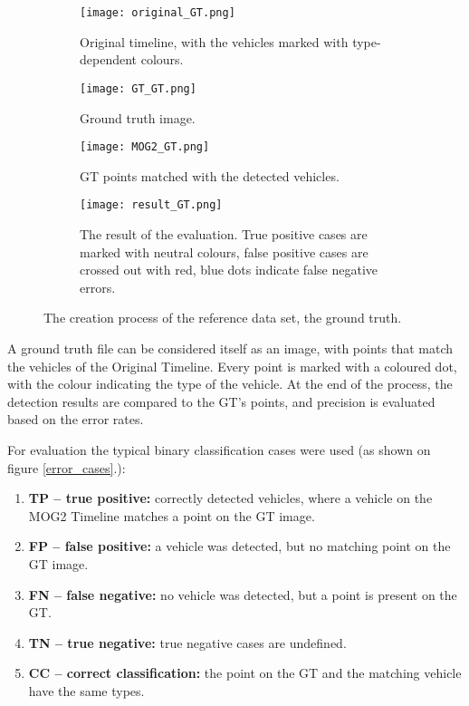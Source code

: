 \begin{figure}[!h]
	\centering
	\begin{subfigure}[!h]{0.9\textwidth}
		\texttt{[image: original\_GT.png]}
		\caption{Original timeline, with the vehicles marked with type-dependent colours.\label{fig:GT_original}}
	\end{subfigure}
	\hfill
	\begin{subfigure}[!h]{0.9\textwidth}
		\texttt{[image: GT\_GT.png]}
		\caption{Ground truth image.\label{fig:GT_GT}}
	\end{subfigure}
	\hfill
	\begin{subfigure}[!h]{0.9\textwidth}
		\texttt{[image: MOG2\_GT.png]}
		\caption{GT points matched with the detected vehicles. \label{fig:GT_MOG}}
	\end{subfigure}
	\hfill
	\begin{subfigure}[!h]{0.9\textwidth}
		\texttt{[image: result\_GT.png]}
		\caption{The result of the evaluation. True positive cases are marked with neutral colours, false positive cases are crossed out with red, blue dots indicate false negative errors.\label{fig:GT_result}}
	\end{subfigure}
	\caption{The creation process of the reference data set, the ground truth.\label{fig:GT}}
\end{figure}

A ground truth file can be considered itself as an image, with points that match the vehicles of the Original Timeline.
Every point is marked with a coloured dot, with the colour indicating the type of the vehicle.
At the end of the process, the detection results are compared to the GT's  points, and precision is evaluated based on the error rates.

\begin{figure}[!h]
	\centering
	
	\caption{ \label{fig:error_cases}}
\end{figure}

For evaluation the typical binary classification cases were used (as shown on figure \ref{error_cases}.):
\begin{enumerate}
\item \textbf{TP -- true positive:} correctly detected vehicles, where a vehicle on the MOG2 Timeline matches a point on the GT image.
\item \textbf{FP -- false positive:} a vehicle was detected, but no matching point on the GT image.
\item \textbf{FN -- false negative:} no vehicle was detected, but a point is present on the GT. 
\item \textbf{TN -- true negative:} true negative cases are undefined.
\item  \textbf{CC -- correct classification:} the point on the GT and the matching vehicle have the same types.
\end{enumerate}

